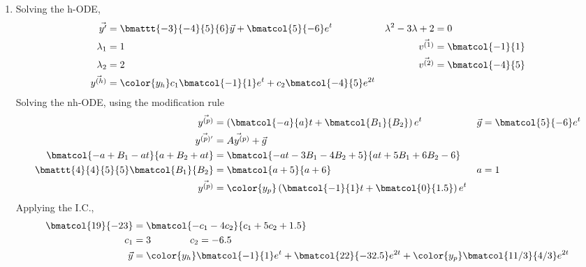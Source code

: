 \begin{enumerate}
    \item Solving the h-ODE,
          \begin{align}
              \vec{y'}                   & = \bmattt{-3}{-4}{5}{6} \vec{y}
              + \bmatcol{5}{-6}e^t       &
              \lambda^{2} - 3\lambda + 2 & = 0                               \\
              \lambda_1                  & = 1                             &
              \vec{v^{(1)}}              & = \bmatcol{-1}{1}                 \\
              \lambda_2                  & = 2                             &
              \vec{v^{(2)}}              & = \bmatcol{-4}{5}                 \\
              \vec{y^{(h)}}              & = \color{y_h}
              c_1 \bmatcol{-1}{1}e^{t} + c_2 \bmatcol{-4}{5} e^{2t}
          \end{align}
          Solving the nh-ODE, using the modification rule
          \begin{align}
              \vec{y^{(p)}}                         & = \left( \bmatcol{-a}{a}t
              + \bmatcol{B_1}{B_2} \right) e^{t}    &
              \vec{g}                               & = \bmatcol{5}{-6}e^{t}        \\
              \vec{y^{(p)'}}                        & = \vec{Ay^{(p)}} + \vec{g}    \\
              \bmatcol{-a+B_1-at}{a+B_2+at}         & = \bmatcol{-at-3B_1-4B_2+5}
              {at+5B_1+6B_2-6}                                                      \\
              \bmattt{4}{4}{5}{5}\bmatcol{B_1}{B_2} & = \bmatcol{a+5}{a+6}        &
              a                                     & = 1                           \\
              \vec{y^{(p)}}                         & = \color{y_p}
              \left( \bmatcol{-1}{1}t + \bmatcol{0}{1.5} \right)e^{t}
          \end{align}
          Applying the I.C.,
          \begin{align}
              \bmatcol{19}{-23} & = \bmatcol{-c_1 - 4c_2}{c_1 + 5c_2 + 1.5} \\
              c_1               & = 3 \qquad\qquad c_2 = -6.5               \\
              \vec{y}           & = {\color{y_h} \bmatcol{-1}{1}e^{t}
              + \bmatcol{22}{-32.5} e^{2t}} + {\color{y_p}
              \bmatcol{11/3}{4/3}e^{2t}}
          \end{align}


\end{enumerate}
